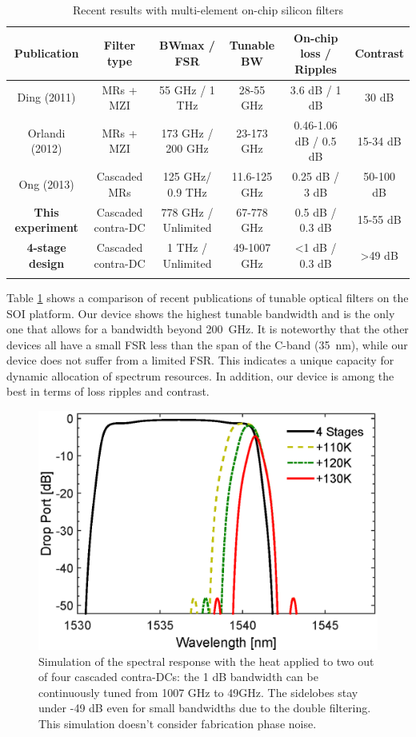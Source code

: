 \documentclass[9pt,twocolumn,twoside]{osajnl}
\begin{document}
\begin{table}[thb]
\caption{Recent results with multi-element on-chip silicon filters}
\begin{tabular}{cccccc}
\hline
Publication & Filter type & BWmax / FSR & Tunable BW & On-chip loss / Ripples & Contrast \\
\hline
Ding (2011)\cite{ding2011bandwidth} &	MRs + MZI &	55 GHz / 1 THz &	28-55 GHz &	3.6 dB / 1 dB &	30 dB
\\
Orlandi (2012)\cite{orlandi2012reconfigurable} &	MRs + MZI &	173 GHz / 200 GHz &	23-173 GHz &	0.46-1.06 dB / 0.5 dB &	15-34 dB
\\
Ong (2013)\cite{ong2013ultra} &	Cascaded MRs &	125 GHz/ 0.9 THz &	11.6-125 GHz &	0.25 dB / 3 dB &	50-100 dB
\\
\textbf{This experiment }& Cascaded contra-DC &	778 GHz / Unlimited  &	67-778 GHz &	0.5 dB / 0.3 dB &	15-55 dB 
\\
\textbf{4-stage design  }& Cascaded contra-DC &	1 THz / Unlimited  &	49-1007 GHz &	<1 dB / 0.3 dB & >49 dB 
\\

\hline
\label{table:comparison}
\end{tabular}
\end{table}

Table \ref{table:comparison} shows a comparison of recent publications of tunable optical filters on the SOI platform. 
Our device shows the highest tunable bandwidth and is the only one that allows for a bandwidth beyond 200~GHz. 
It is noteworthy that the other devices all have a small FSR less than the span of the C-band (35~nm), while our device does not suffer from a limited FSR.
This indicates a unique capacity for dynamic allocation of spectrum resources.
In addition, our device is among the best in terms of loss ripples and contrast.


\begin{figure}[htbp]
\centering
\includegraphics[width=.99\columnwidth]{data/4StageDesignCompiled2}
\caption{Simulation of the spectral response with the heat applied to two out of four cascaded contra-DCs: the 1 dB bandwidth can be continuously tuned from 1007 GHz to  49GHz. The sidelobes stay under -49 dB even for small bandwidths due to the double filtering. This simulation doesn't consider fabrication phase noise.}
\label{fig:bandTuneSimu}
\end{figure} 
\end{document}
